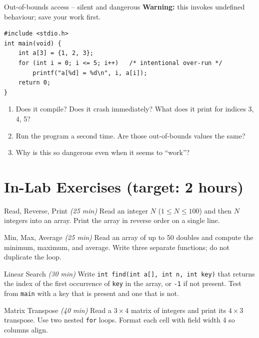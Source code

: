 \documentclass[11pt]{article}
\begin{document}
\begin{tryit}{Out-of-bounds access -- silent and dangerous}
\textbf{Warning:} this invokes undefined behaviour; save your work first.
\begin{lstlisting}
#include <stdio.h>
int main(void) {
    int a[3] = {1, 2, 3};
    for (int i = 0; i <= 5; i++)   /* intentional over-run */
        printf("a[%d] = %d\n", i, a[i]);
    return 0;
}
\end{lstlisting}
\begin{enumerate}[nosep,leftmargin=*]
  \item Does it compile? Does it crash immediately? What does it print for indices 3, 4, 5?
  \item Run the program a second time. Are those out-of-bounds values the same?
  \item Why is this so dangerous even when it seems to ``work''?
\end{enumerate}
\end{tryit}

\section*{In-Lab Exercises (target: 2 hours)}

\begin{labexercise}{Read, Reverse, Print \hfill {\small \itshape (25 min)}}
Read an integer $N$ ($1 \leq N \leq 100$) and then $N$ integers into an array.
Print the array in reverse order on a single line.
\end{labexercise}

\begin{labexercise}{Min, Max, Average \hfill {\small \itshape (25 min)}}
Read an array of up to 50 doubles and compute the minimum, maximum, and average.
Write three separate functions; do not duplicate the loop.
\end{labexercise}

\begin{labexercise}{Linear Search \hfill {\small \itshape (30 min)}}
Write \texttt{int find(int a[], int n, int key)} that returns the index of the first
occurrence of \texttt{key} in the array, or \texttt{-1} if not present. Test from
\texttt{main} with a key that is present and one that is not.
\end{labexercise}

\begin{labexercise}{Matrix Transpose \hfill {\small \itshape (40 min)}}
Read a $3 \times 4$ matrix of integers and print its $4 \times 3$ transpose. Use
two nested \texttt{for} loops. Format each cell with field width 4 so columns align.
\end{labexercise}
\end{document}
